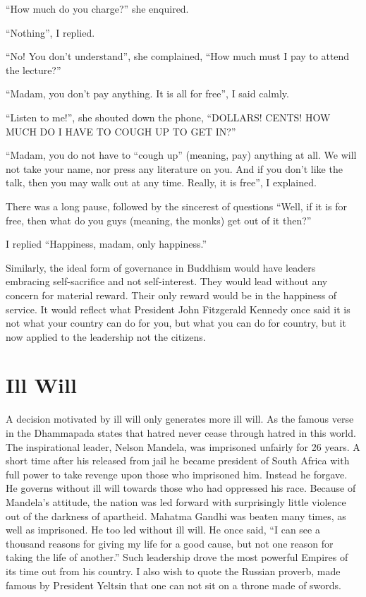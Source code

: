 \documentclass[11pt, openany]{book}
\begin{document}
“How much do you charge?” she enquired.

“Nothing”, I replied.

“No! You don’t understand”, she complained, “How much must I pay to attend the lecture?”

“Madam, you don’t pay anything. It is all for free”, I said calmly.

“Listen to me!”, she shouted down the phone, “DOLLARS! CENTS! HOW MUCH DO I HAVE TO COUGH UP TO GET IN?”

“Madam, you do not have to “cough up” (meaning, pay) anything at all. We will not take your name, nor press any literature on you. And if you don’t like the talk, then you may walk out at any time. Really, it is free”, I explained.

There was a long pause, followed by the sincerest of questions “Well, if it is for free, then what do you guys (meaning, the monks) get out of it then?”

I replied “Happiness, madam, only happiness.”

Similarly, the ideal form of governance in Buddhism would have leaders embracing self-sacrifice and not self-interest. They would lead without any concern for material reward. Their only reward would be in the happiness of service. It would reflect what President John Fitzgerald Kennedy once said it is not what your country can do for you, but what you can do for country, but it now applied to the leadership not the citizens.

\section{Ill Will}

A decision motivated by ill will only generates more ill will. As the famous verse in the Dhammapada states that hatred never cease through hatred in this world. The inspirational leader, Nelson Mandela, was imprisoned unfairly for 26 years. A short time after his released from jail he became president of South Africa with full power to take revenge upon those who imprisoned him. Instead he forgave. He governs without ill will towards those who had oppressed his race. Because of Mandela’s attitude, the nation was led forward with surprisingly little violence out of the darkness of apartheid.
Mahatma Gandhi was beaten many times, as well as imprisoned. He too led without ill will. He once said, “I can see a thousand reasons for giving my life for a good cause, but not one reason for taking the life of another.” Such leadership drove the most powerful Empires of its time out from his country. I also wish to quote the Russian proverb, made famous by President Yeltsin that one can not sit on a throne made of swords.
\end{document}
